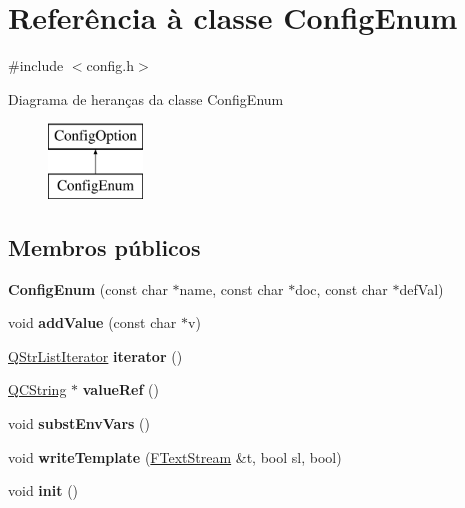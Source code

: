 \hypertarget{class_config_enum}{\section{Referência à classe Config\-Enum}
\label{class_config_enum}
}


{\ttfamily \#include $<$config.\-h$>$}

Diagrama de heranças da classe Config\-Enum\begin{figure}[H]
\begin{center}
\leavevmode
\includegraphics[height=2.000000cm]{class_config_enum}
\end{center}
\end{figure}
\subsection*{Membros públicos}
\begin{DoxyCompactItemize}
\item 
\hypertarget{class_config_enum_a6739260a09681cc4cfd7aab80fca2ebe}{{\bfseries Config\-Enum} (const char $\ast$name, const char $\ast$doc, const char $\ast$def\-Val)}\label{class_config_enum_a6739260a09681cc4cfd7aab80fca2ebe}

\item 
\hypertarget{class_config_enum_a6330b95a0b46d7452b8c0e7f61a523de}{void {\bfseries add\-Value} (const char $\ast$v)}\label{class_config_enum_a6330b95a0b46d7452b8c0e7f61a523de}

\item 
\hypertarget{class_config_enum_af993f7e0e41e6fe5975ee78724e46cdb}{\hyperlink{class_q_list_iterator}{Q\-Str\-List\-Iterator} {\bfseries iterator} ()}\label{class_config_enum_af993f7e0e41e6fe5975ee78724e46cdb}

\item 
\hypertarget{class_config_enum_a9c4fe5ca500670ba901c995ab38ec6c9}{\hyperlink{class_q_c_string}{Q\-C\-String} $\ast$ {\bfseries value\-Ref} ()}\label{class_config_enum_a9c4fe5ca500670ba901c995ab38ec6c9}

\item 
\hypertarget{class_config_enum_a79866440425087f224d4f77311efad6a}{void {\bfseries subst\-Env\-Vars} ()}\label{class_config_enum_a79866440425087f224d4f77311efad6a}

\item 
\hypertarget{class_config_enum_ad532b92c9971149d194403dff3458ba7}{void {\bfseries write\-Template} (\hyperlink{class_f_text_stream}{F\-Text\-Stream} \&t, bool sl, bool)}\label{class_config_enum_ad532b92c9971149d194403dff3458ba7}

\item 
\hypertarget{class_config_enum_a02fd73d861ef2e4aabb38c0c9ff82947}{void {\bfseries init} ()}\label{class_config_enum_a02fd73d861ef2e4aabb38c0c9ff82947}

\end{DoxyCompactItemize}
